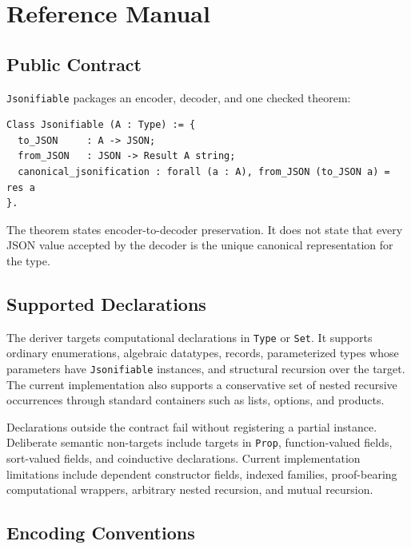 \section{Reference Manual}
\label{app:reference}

\subsection{Public Contract}

\texttt{Jsonifiable} packages an encoder, decoder, and one checked theorem:

\begin{lstlisting}[language=Coq]
Class Jsonifiable (A : Type) := {
  to_JSON     : A -> JSON;
  from_JSON   : JSON -> Result A string;
  canonical_jsonification : forall (a : A), from_JSON (to_JSON a) = res a
}.
\end{lstlisting}

The theorem states encoder-to-decoder preservation.  It does not state that
every JSON value accepted by the decoder is the unique canonical representation
for the type.

\subsection{Supported Declarations}

The deriver targets computational declarations in \texttt{Type} or
\texttt{Set}.  It supports ordinary enumerations, algebraic datatypes, records,
parameterized types whose parameters have \texttt{Jsonifiable} instances, and
structural recursion over the target.  The current implementation also supports
a conservative set of nested recursive occurrences through standard containers
such as lists, options, and products.

Declarations outside the contract fail without registering a partial instance.
Deliberate semantic non-targets include targets in \texttt{Prop},
function-valued fields, sort-valued fields, and coinductive declarations.
Current implementation limitations include dependent constructor fields, indexed
families, proof-bearing computational wrappers, arbitrary nested recursion, and
mutual recursion.

\subsection{Encoding Conventions}

